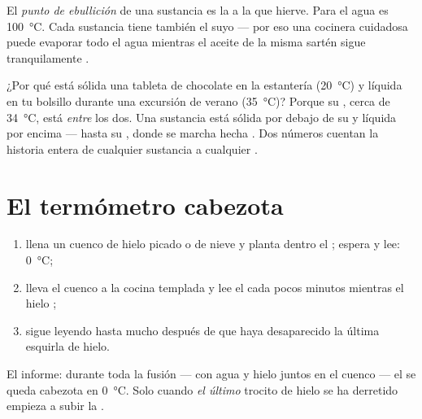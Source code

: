 \begin{definition}\label{def:g4:changes-of-state:boiling-point}
El \emph{punto de ebullición} de una
sustancia es la  a la que hierve. Para el agua es
\qty{100}{\celsius}. Cada sustancia tiene también el suyo --- por eso
una cocinera cuidadosa puede evaporar todo el agua mientras el aceite
de la misma sartén sigue tranquilamente .
\end{definition}

\begin{example}\label{ex:g4:changes-of-state:reading}
¿Por qué está sólida una tableta de chocolate en la estantería
(\qty{20}{\celsius}) y líquida en tu bolsillo durante una excursión de
verano (\qty{35}{\celsius})? Porque su , cerca de
\qty{34}{\celsius}, está \emph{entre} los dos. Una sustancia está
sólida por debajo de su  y líquida por encima
--- hasta su , donde se marcha hecha . Dos
números cuentan la historia entera de cualquier sustancia a cualquier
.
\end{example}

\section{El termómetro cabezota}

\begin{method}\label{met:g4:changes-of-state:watch}
\begin{enumerate}
  \item llena un cuenco de hielo picado o de nieve y planta dentro el
        ; espera y lee: \qty{0}{\celsius};
  \item lleva el cuenco a la cocina templada y lee el 
        cada pocos minutos mientras el hielo ;
  \item sigue leyendo hasta mucho después de que haya desaparecido la
        última esquirla de hielo.
\end{enumerate}
El informe: durante toda la fusión --- con agua y hielo juntos en el
cuenco --- el  se queda cabezota en \qty{0}{\celsius}. Solo
cuando \emph{el último} trocito de hielo se ha derretido empieza a
subir la .
\end{method}

